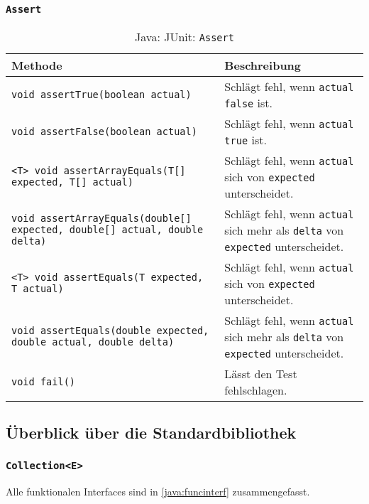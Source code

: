 \documentclass[a4paper, 11pt, accentcolor = tud3b]{tudreport}
\begin{document}
            \subsubsection{\texttt{Assert}}
                \begin{sidewaystable}
                    \centering
                    \begin{tabular}{l | p{8cm}}
                        Methode & Beschreibung \\
                        \hline
                        \texttt{void assertTrue(boolean actual)} & Schlägt fehl, wenn \texttt{actual} \texttt{false} ist. \\
                        \texttt{void assertFalse(boolean actual)} & Schlägt fehl, wenn \texttt{actual} \texttt{true} ist. \\
                        \texttt{<T> void assertArrayEquals(T[] expected, T[] actual)} & Schlägt fehl, wenn \texttt{actual} sich von \texttt{expected} unterscheidet. \\
                        \texttt{void assertArrayEquals(double[] expected, double[] actual, double delta)} & Schlägt fehl, wenn \texttt{actual} sich mehr als \texttt{delta} von \texttt{expected} unterscheidet. \\
                        \texttt{<T> void assertEquals(T expected, T actual)} & Schlägt fehl, wenn \texttt{actual} sich von \texttt{expected} unterscheidet. \\
                        \texttt{void assertEquals(double expected, double actual, double delta)} & Schlägt fehl, wenn \texttt{actual} sich mehr als \texttt{delta} von \texttt{expected} unterscheidet. \\
                        \texttt{void fail()} & Lässt den Test fehlschlagen. \\
                    \end{tabular}
                    \caption{Java: JUnit: \texttt{Assert}}
                \end{sidewaystable}




        \subsection{Überblick über die Standardbibliothek}
            \subsubsection{\texttt{Collection<E>}}
                Alle funktionalen Interfaces sind in \ref{java:funcinterf} zusammengefasst.
\end{document}
